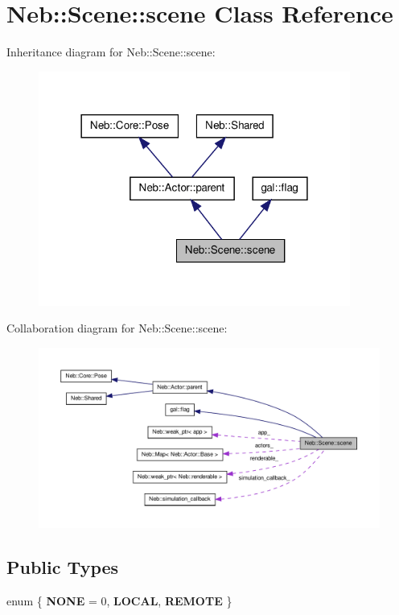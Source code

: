 \hypertarget{classNeb_1_1Scene_1_1scene}{\section{\-Neb\-:\-:\-Scene\-:\-:scene \-Class \-Reference}
\label{classNeb_1_1Scene_1_1scene}
}


\-Inheritance diagram for \-Neb\-:\-:\-Scene\-:\-:scene\-:
\nopagebreak
\begin{figure}[H]
\begin{center}
\leavevmode
\includegraphics[width=290pt]{classNeb_1_1Scene_1_1scene__inherit__graph}
\end{center}
\end{figure}


\-Collaboration diagram for \-Neb\-:\-:\-Scene\-:\-:scene\-:
\nopagebreak
\begin{figure}[H]
\begin{center}
\leavevmode
\includegraphics[width=350pt]{classNeb_1_1Scene_1_1scene__coll__graph}
\end{center}
\end{figure}
\subsection*{\-Public \-Types}
\begin{DoxyCompactItemize}
\item 
enum \{ {\bfseries \-N\-O\-N\-E} =  0, 
{\bfseries \-L\-O\-C\-A\-L}, 
{\bfseries \-R\-E\-M\-O\-T\-E}
 \}
\end{DoxyCompactItemize}
